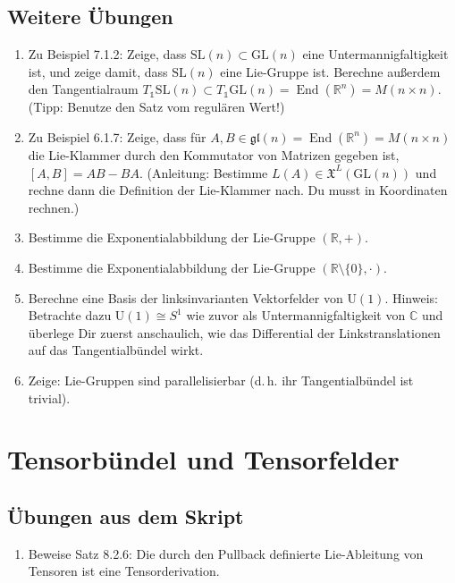 \documentclass[a4paper,headsepline,headheight=30pt,numbers=enddot]{scrartcl}
\DeclareMathOperator{\End}{End}
\newcommand{\R}{\mathbb{R}}
\newcommand{\vf}{\mathfrak{X}}
\begin{document}
	\subsection*{Weitere Übungen}
	\begin{enumerate}
		\item Zu Beispiel 7.1.2: Zeige, dass $\mathrm{SL}(n) \subset \mathrm{GL}(n)$ eine Untermannigfaltigkeit ist, und zeige damit, dass $\mathrm{SL}(n)$ eine Lie-Gruppe ist. Berechne außerdem den Tangentialraum $T_\mathds{1}\mathrm{SL}(n) \subset T_\mathds{1}\mathrm{GL}(n) = \End(\R^n) = M(n\times n)$. (Tipp: Benutze den Satz vom regulären Wert!)
		\item Zu Beispiel 6.1.7: Zeige, dass für $A,B \in \mathfrak{gl}(n) = \End(\R^n) = M(n\times n)$ die Lie-Klammer durch den Kommutator von Matrizen gegeben ist, $[A,B] = AB - BA$. (Anleitung: Bestimme $L(A) \in \vf^L(\mathrm{GL}(n))$ und rechne dann die Definition der Lie-Klammer nach. Du musst in Koordinaten rechnen.)
		\item Bestimme die Exponentialabbildung der Lie-Gruppe $(\R,+)$.
		\item Bestimme die Exponentialabbildung der Lie-Gruppe $(\R\setminus\{0\},\cdot)$.
		\item Berechne eine Basis der linksinvarianten Vektorfelder von $\mathrm{U}(1)$. Hinweis: Betrachte dazu $\mathrm{U}(1)\cong S^1$ wie zuvor als Untermannigfaltigkeit von $\mathbb{C}$ und überlege Dir zuerst anschaulich, wie das Differential der Linkstranslationen auf das Tangentialbündel wirkt.
		\item Zeige: Lie-Gruppen sind parallelisierbar (d.\,h. ihr Tangentialbündel ist trivial).
	\end{enumerate}
	
	\newpage
	\section{Tensorbündel und Tensorfelder}
	\subsection*{Übungen aus dem Skript}
	\begin{enumerate}
		\item Beweise Satz 8.2.6: Die durch den Pullback definierte Lie-Ableitung von Tensoren ist eine Tensorderivation.
	\end{enumerate}
\end{document}
